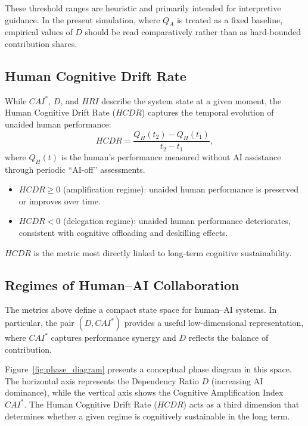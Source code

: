 \documentclass[11pt,a4paper]{article}
\begin{document}
These threshold ranges are heuristic and primarily intended for interpretive guidance. In the present simulation, where $Q_A$ is treated as a fixed baseline, empirical values of $D$ should be read comparatively rather than as hard-bounded contribution shares.

\subsection{Human Cognitive Drift Rate}

While $CAI^*$, $D$, and $HRI$ describe the system state at a given moment, the Human Cognitive Drift Rate ($HCDR$) captures the temporal evolution of unaided human performance:
\begin{equation}
HCDR = \frac{Q_H(t_2) - Q_H(t_1)}{t_2 - t_1},
\end{equation}
where $Q_H(t)$ is the human's performance measured without AI assistance through periodic ``AI-off'' assessments.

\begin{itemize}
\item $HCDR \geq 0$ (amplification regime): unaided human performance is preserved or improves over time.
\item $HCDR < 0$ (delegation regime): unaided human performance deteriorates, consistent with cognitive offloading and deskilling effects.
\end{itemize}

$HCDR$ is the metric most directly linked to long-term cognitive sustainability.

\subsection{Regimes of Human--AI Collaboration}

The metrics above define a compact state space for human--AI systems. In particular, the pair $(D, CAI^*)$ provides a useful low-dimensional representation, where $CAI^*$ captures performance synergy and $D$ reflects the balance of contribution.

Figure~\ref{fig:phase_diagram} presents a conceptual phase diagram in this space. The horizontal axis represents the Dependency Ratio $D$ (increasing AI dominance), while the vertical axis shows the Cognitive Amplification Index $CAI^*$. The Human Cognitive Drift Rate ($HCDR$) acts as a third dimension that determines whether a given regime is cognitively sustainable in the long term.
\end{document}
